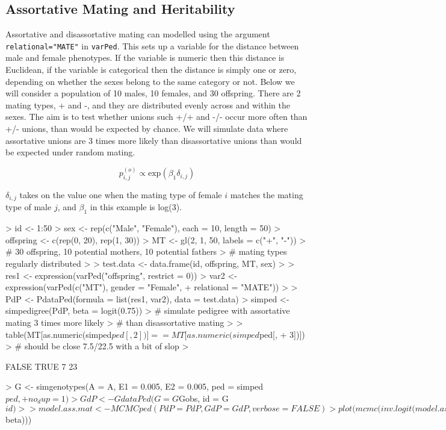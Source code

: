\documentclass{article}
\begin{document}
\subsection{Assortative Mating and Heritability}

Assortative and disassortative mating can modelled using the argument \texttt{relational="MATE"} in \texttt{varPed}. This sets up a variable for the distance between male and female phenotypes.  If the variable is numeric then this distance is Euclidean, if the variable is categorical then the distance is simply one or zero, depending on whether the sexes belong to the same category or not.  Below we will consider a population of 10 males, 10 females, and 30 offspring.  There are 2 mating types, + and -, and they are distributed evenly across and within the sexes.   The aim is to test whether unions such +/+ and -/- occur more often than +/- unions, than would be expected by chance.  We will simulate data where assortative unions are 3 times more likely than disassortative unions than would be expected under random mating.  

\begin{equation}
p^{(o)}_{i,j} \propto \textrm{exp}(\beta_{1}\delta_{i,j})
\label{AM-eq}
\end{equation}

$\delta_{i,j}$ takes on the value one when the mating type of female $i$ matches the mating type of male $j$, and $\beta_{1}$ in this example is log(3).

\begin{Schunk}
\begin{Sinput}
> id <- 1:50
> sex <- rep(c("Male", "Female"), each = 10, length = 50)
> offspring <- c(rep(0, 20), rep(1, 30))
> MT <- gl(2, 1, 50, labels = c("+", "-"))
> # 30 offspring, 10 potential mothers, 10 potential fathers
> # mating types regularly distributed 
>
> test.data <- data.frame(id, offspring, MT, sex)
>
> res1 <- expression(varPed("offspring", restrict = 0))
> var2 <- expression(varPed(c("MT"), gender = "Female", 
+     relational = "MATE"))
>
> PdP <- PdataPed(formula = list(res1, var2), data = test.data)
> simped <- simpedigree(PdP, beta = logit(0.75))
> # simulate pedigree with assortative mating 3 times more likely
> # than disassortative mating
>
> table(MT[as.numeric(simped$ped[, 2])] == MT[as.numeric(simped$ped[, 
+     3])])
> # should be close 7.5/22.5 with a bit of slop
>
\end{Sinput}
\begin{Soutput}
FALSE  TRUE 
    7    23 
\end{Soutput}
\begin{Sinput}
> G <- simgenotypes(A = A, E1 = 0.005, E2 = 0.005, ped = simped$ped, 
+     no_dup = 1)
> GdP <- GdataPed(G = G$Gobs, id = G$id)
>
> model.ass.mat <- MCMCped(PdP = PdP, GdP = GdP, verbose = FALSE)
> plot(mcmc(inv.logit(model.ass.mat$beta)))
\end{Sinput}
\end{Schunk}
\end{document}
